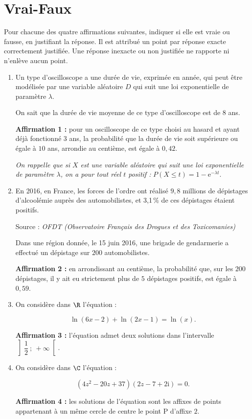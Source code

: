 \documentclass{cornouaille}
\begin{document}
\section{Vrai-Faux}
\begin{exercice}


Pour chacune des quatre affirmations suivantes, indiquer si elle est vraie ou fausse, en justifiant la
réponse. Il est attribué un point par réponse exacte correctement justifiée. Une réponse inexacte ou
non justifiée ne rapporte ni n'enlève aucun point.

\bigskip

\begin{enumerate}
\item Un type d'oscilloscope a une durée de vie, exprimée en année, qui peut être modélisée par une
variable aléatoire $D$ qui suit une loi exponentielle de paramètre $\lambda$.

On sait que la durée de vie moyenne de ce type d'oscilloscope est de $8$ ans.

\smallskip

\textbf{Affirmation 1 :} pour un oscilloscope de ce type choisi au hasard et ayant déjà fonctionné $3$ ans,
la probabilité que la durée de vie soit supérieure ou égale à $10$ ans, arrondie au centième, est
égale à $0,42$.

\emph{On rappelle que si $X$ est une variable aléatoire qui suit une loi exponentielle de paramètre $\lambda$, on a pour tout réel $t$ positif :} $P(X \leqslant t) = 1 - \text{e}^{-\lambda t}$.
\item  En 2016, en France, les forces de l'ordre ont réalisé $9,8$ millions de dépistages d'alcoolémie
auprès des automobilistes, et 3,1\,\% de ces dépistages étaient positifs.

Source : \emph{OFDT (Observatoire Français des Drogues et des Toxicomanies)}

Dans une région donnée, le 15 juin 2016, une brigade de gendarmerie a effectué un dépistage
sur $200$ automobilistes.

\smallskip

\textbf{Affirmation 2 :} en arrondissant au centième, la probabilité que, sur les $200$ dépistages, il y ait
eu strictement plus de $5$ dépistages positifs, est égale à $0,59$.
\item  On considère dans $\R$ l'équation :

\[\ln (6 x - 2) + \ln (2x - 1) = \ln (x).\]

\smallskip

\textbf{Affirmation 3 :} l'équation admet deux solutions dans l'intervalle $\left]\dfrac{1}{2}~;~+ \infty\right[$.
\item  On considère dans $\C$ l'équation : 

\[\left(4z^2 - 20z + 37\right)(2z -7 + 2\text{i}) = 0.\]


\smallskip

\textbf{Affirmation 4 :} les solutions de l'équation sont les affixes de points appartenant à un même
cercle de centre le point P d'affixe $2$.
\end{enumerate}
\end{exercice}
\end{document}

